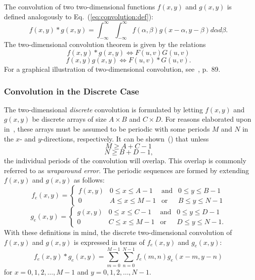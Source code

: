The convolution of two two-dimensional functions $f(x,y)$ and $g(x,y)$
is defined analogously to Eq.~(\ref{eq:convolution:def}):
\begin{equation}
  f(x,y)\ast g(x,y)=\int_{-\infty}^{\infty}\int_{-\infty}^{\infty}
  f(\alpha,\beta)g(x-\alpha,y-\beta)d\alpha d\beta\mbox{.}
\end{equation}
The two-dimensional convolution theorem is given by the relations
\begin{equation}
\label{eq:convolution:2Da}
  f(x,y)\ast g(x,y)\Leftrightarrow F(u,v)G(u,v)
\end{equation}
\begin{equation}
\label{eq:convolution:2Db}
  f(x,y)g(x,y)\Leftrightarrow F(u,v)\ast G(u,v)\mbox{.}
\end{equation}
For a graphical illustration of two-dimensional convolution,
see~\cite{digim}, p.\ 89.

\subsubsection{Convolution in the Discrete Case}

The two-dimensional {\em discrete\/} convolution is formulated by
letting $f(x,y)$ and $g(x,y)$ be discrete arrays of size $A\times B$
and $C\times D$.  For reasons elaborated upon in~\cite{brigham}, these
arrays must be assumed to be periodic with some periods $M$ and $N$ in
the $x$- and $y$-directions, respectively.  It can be
shown~(\cite{brigham}) that unless
\begin{equation}
  M\geq A+C-1
\end{equation}
\begin{equation}
  N\geq B+D-1\mbox{,}
\end{equation}
the individual periods of the convolution will overlap.  This overlap
is commonly referred to as {\em wraparound error\/}.  The periodic
sequences are formed by extending $f(x,y)$ and $g(x,y)$ as follows:
\begin{equation}
  f_{e}(x,y)=\left\{
    \begin{array}{llll}
      f(x,y) & 0\leq x\leq A-1 & \mbox{and} & 0\leq y\leq B-1 \\
      0      & A\leq x\leq M-1 & \mbox{or}  & B\leq y\leq N-1
    \end{array} \right.
\end{equation}
\begin{equation}
  g_{e}(x,y)=\left\{
    \begin{array}{llll}
      g(x,y) & 0\leq x\leq C-1 & \mbox{and} & 0\leq y\leq D-1 \\
      0      & C\leq x\leq M-1 & \mbox{or}  & D\leq y\leq N-1\mbox{.}
    \end{array} \right.
\end{equation}
With these definitions in mind, the discrete two-dimensional
convolution of $f(x,y)$ and $g(x,y)$ is expressed in terms of
$f_{e}(x,y)$ and $g_{e}(x,y)$:
\begin{equation}
\label{eq:convolution:discrete}
  f_{e}(x,y)\ast g_{e}(x,y)=\sum_{m=0}^{M-1}\sum_{n=0}^{N-1}
  f_{e}(m,n)g_{e}(x-m,y-n)
\end{equation}
for $x=0,1,2,\ldots,M-1$ and $y=0,1,2,\ldots,N-1$.

